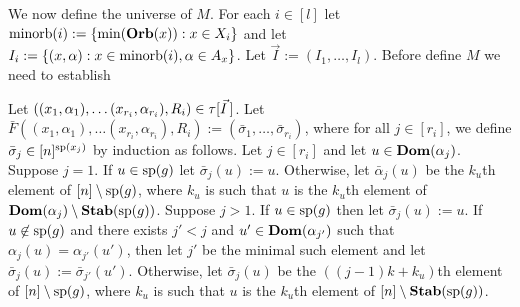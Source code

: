 \documentclass[../main/thesis.tex]{subfiles}
\begin{document}
We now define the universe of $M$. For each $i \in [l]$ let $\text{\upshape minorb}(i) :=
\{\min (\text{\textbf{Orb}}(x)) : x \in X_i\}$ and let $I_{i} := \{(x, \alpha): x \in \text{\upshape minorb}(i), \alpha \in A_x\}$. Let $\vec{I} := (I_1, \ldots, I_{l})$. Before define $M$
we need to establish

Let $((x_1, \alpha_1), \ldots (x_{r_i}, \alpha_{r_i}), R_i) \in
\tau[\vec{I} \,]$. Let $\bar{F}((x_1, \alpha_1), \ldots (x_{r_i},
\alpha_{r_i}), R_i) := (\bar{\sigma}_1, \ldots, \bar{\sigma}_{r_i})$, where for
all $j \in [r_i]$, we define $\bar{\sigma}_j\in [n]^{\text{sp}(x_j)}$ by induction
as follows. Let $j \in [r_i]$ and let $u \in \text{\textbf{Dom}}(\alpha_j)$. Suppose $j = 1$.
If $u \in \text{sp}(g)$ let $\bar{\sigma}_j (u) := u$. Otherwise, let
$\bar{\alpha}_j (u)$ be the $k_u$th element of $[n] \setminus \text{sp}(g)$, where
$k_u$ is such that $u$ is the $k_u$th element of $\text{\textbf{Dom}}(\alpha_j) \setminus
\text{\textbf{Stab}} (\text{sp} (g))$. Suppose $j > 1$. If $u \in \text{sp}(g)$ then let $\bar{\sigma}_j(u)
:= u$. If $u \not\in \text{sp}(g)$ and there exists $j' < j$ and $u' \in \text{\textbf{Dom}}
(\alpha_{j'})$ such that $\alpha_j (u) = \alpha_{j'}(u')$, then let $j'$ be the
minimal such element and let $\bar{\sigma}_j (u) := \bar{\sigma}_{j'}(u')$.
Otherwise, let $\bar{\sigma}_j (u)$ be the $((j - 1)k + k_u)$th element of $[n]
\setminus \text{sp}(g)$, where $k_u$ is such that $u$ is the $k_u$th element of
$[n] \setminus \text{\textbf{Stab}} (\text{sp} (g))$.
\end{document}
